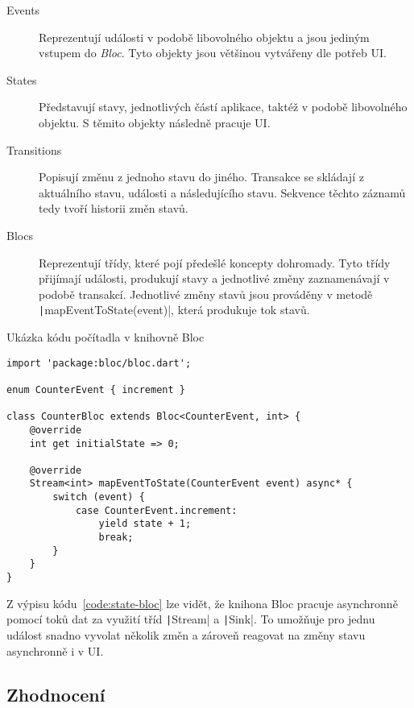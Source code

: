 \begin{description}
    \item[Events] Reprezentují události v podobě libovolného objektu
    a jsou jediným vstupem do \emph{Bloc}.
    Tyto objekty jsou většinou vytvářeny dle potřeb UI.
    \item[States] Představují stavy,
    jednotlivých částí aplikace,
    taktéž v podobě libovolného objektu.
    S těmito objekty následně pracuje UI.
    \item[Transitions] Popisují změnu z jednoho stavu do jiného.
    Transakce se skládají z aktuálního stavu, události a následujícího stavu.
    Sekvence těchto záznamů tedy tvoří historii změn stavů.
    \item[Blocs] Reprezentují třídy,
    které pojí předešlé koncepty dohromady.
    Tyto třídy přijímají události, produkují stavy a jednotlivé změny
    zaznamenávají v podobě transakcí.
    Jednotlivé změny stavů jsou prováděny v metodě
    \texttt|mapEventToState(event)|,
    která produkuje tok stavů.
\end{description}

\begin{listing}
    \caption{Ukázka kódu počítadla v knihovně
    Bloc~\cite{bloclibrary_coreconcepts}}
    \label{code:state-bloc}
    \begin{verbatim}
import 'package:bloc/bloc.dart';

enum CounterEvent { increment }

class CounterBloc extends Bloc<CounterEvent, int> {
    @override
    int get initialState => 0;

    @override
    Stream<int> mapEventToState(CounterEvent event) async* {
        switch (event) {
            case CounterEvent.increment:
                yield state + 1;
                break;
        }
    }
}
    \end{verbatim}
\end{listing}

Z výpisu kódu~\ref{code:state-bloc} lze vidět,
že knihona Bloc pracuje asynchronně pomocí toků dat za využití
tříd \texttt|Stream| a \texttt|Sink|.
To umožňuje pro jednu událost snadno vyvolat několik změn
a zároveň reagovat na změny stavu asynchronně i v UI.

\subsection{Zhodnocení}

